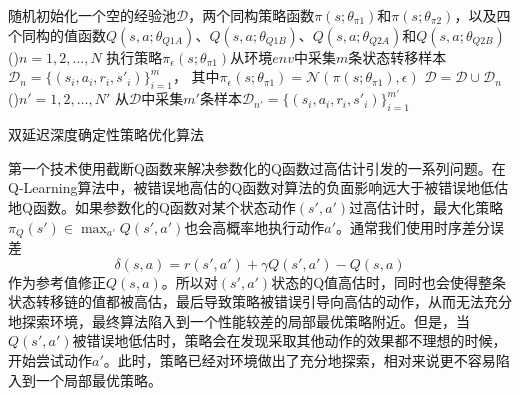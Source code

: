\begin{algorithm}[htbp]
    \LinesNumbered

    随机初始化一个空的经验池$\mathcal{D}$，两个同构策略函数$\pi(s; \theta_{\pi1})$和$\pi(s; \theta_{\pi2})$，以及四个同构的值函数$Q(s, a; \theta_{Q1A})$、$Q(s, a; \theta_{Q1B})$、$Q(s, a; \theta_{Q2A})$和$Q(s, a; \theta_{Q2B})$\;
    \For(){$n = 1,2, \ldots, N$}{
        执行策略$\pi_{\epsilon}(s; \theta_{\pi1})$从环境$env$中采集$m$条状态转移样本$\mathcal{D}_n = \{(s_i, a_i, r_i, s'_i)\}^{m}_{i=1}$，
        其中$\pi_{\epsilon}(s; \theta_{\pi1}) = \mathcal{N}(\pi(s;\theta_{\pi1}), \epsilon)$\;
        $\mathcal{D} = \mathcal{D} \cup \mathcal{D}_n$\;
        \For(){$n' = 1, 2, \ldots, N'$}{
            从$\mathcal{D}$中采集$m'$条样本$\mathcal{D}_{n'} = \{(s_i, a_i, r_i, s'_i)\}^{m'}_{i=1}$\;
            \;
        }
    }
    \caption{双延迟深度确定性策略优化算法}
    \label{alg:td3}
\end{algorithm}

第一个技术使用截断Q函数来解决参数化的Q函数过高估计引发的一系列问题。在Q-Learning算法中，被错误地高估的Q函数对算法的负面影响远大于被错误地低估地Q函数。如果参数化的Q函数对某个状态动作$(s', a')$过高估计时，最大化策略$\pi_Q(s') \in \max_{a'} Q(s', a')$也会高概率地执行动作$a'$。通常我们使用时序差分误差
\begin{equation}
    \delta(s, a) = r(s', a') + \gamma Q(s', a') - Q(s, a)
\end{equation}
作为参考值修正$Q(s, a)$。所以对$(s', a')$状态的Q值高估时，同时也会使得整条状态转移链的值都被高估，最后导致策略被错误引导向高估的动作，从而无法充分地探索环境，最终算法陷入到一个性能较差的局部最优策略附近。但是，当$Q(s', a')$被错误地低估时，策略会在发现采取其他动作的效果都不理想的时候，开始尝试动作$a'$。此时，策略已经对环境做出了充分地探索，相对来说更不容易陷入到一个局部最优策略。

